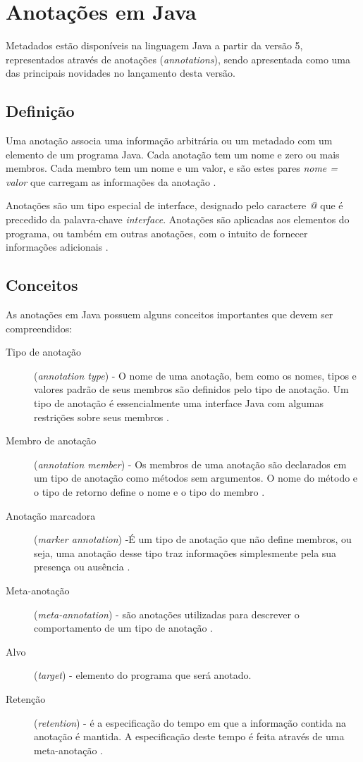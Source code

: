\documentclass[tc,oneside]{iiufrgs}
\begin{document}
\section{Anotações em Java}
Metadados estão disponíveis na linguagem Java a partir da versão 5,  representados através de anotações (\textit{annotations}), sendo apresentada como uma das principais novidades no lançamento desta versão.
\subsection{Definição}

Uma anotação associa uma informação arbitrária ou um metadado com um elemento de um programa Java. Cada anotação tem um nome e zero ou mais membros. Cada membro tem um nome e um valor, e são
estes pares \textit{nome = valor} que carregam as informações da anotação \cite{flanagan2005java}.

Anotações são um tipo especial de interface, designado pelo caractere \textit{@} que é precedido da palavra-chave \textit{interface}. Anotações são aplicadas aos elementos do programa, ou também em outras anotações, com o intuito de fornecer informações adicionais \cite{arnold2000java}.

\subsection{Conceitos}

As anotações em Java possuem alguns conceitos importantes que devem ser compreendidos: 

\begin{description}
\item [Tipo de anotação] (\textit{annotation type}) - O nome de uma anotação, bem como os nomes, tipos e valores padrão de seus membros são definidos pelo tipo de anotação. Um tipo de anotação é essencialmente uma interface Java com algumas restrições sobre seus membros \cite{flanagan2005java}.
\item [Membro de anotação] (\textit{annotation member}) - Os membros de uma anotação são declarados em um tipo de anotação como métodos sem argumentos. O nome do método e o tipo de retorno define o nome e o
tipo do membro \cite{flanagan2005java}.
\item [Anotação marcadora] (\textit{marker annotation}) -É um tipo de anotação que não define membros, ou seja, uma anotação desse tipo traz informações simplesmente pela sua presença ou ausência \cite{flanagan2005java}.
\item [Meta-anotação] (\textit{meta-annotation}) - são anotações utilizadas para descrever o comportamento de um tipo de anotação \cite{horstmann2004core}.
\item [Alvo] (\textit{target}) - elemento do programa que será anotado.
\item [Retenção] (\textit{retention}) - é a especificação do tempo em que a informação contida na anotação é mantida. A especificação deste tempo é feita através de uma meta-anotação \cite{flanagan2005java}.
\end{description}
\end{document}
